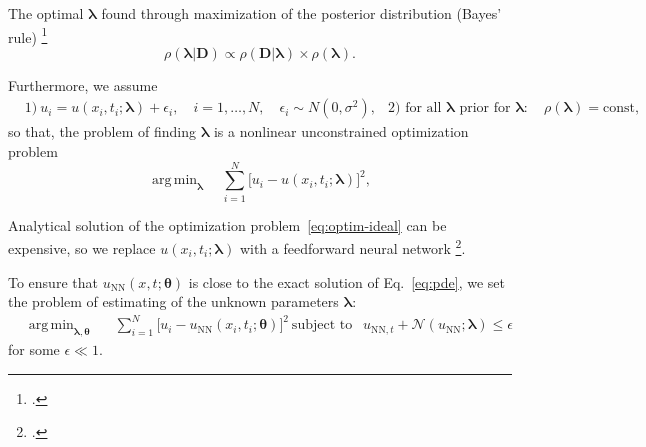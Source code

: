 \documentclass{beamer}
\def\\{}%
\newcommand{\Data}{\vec{D}}
\renewcommand{\vec}[1]{\boldsymbol{#1}}
\newcommand{\VTheta}{\ensuremath{\vec{\theta}}}
\newcommand{\VLambda}{\ensuremath{\vec{\lambda}}}
\DeclareMathOperator*{\argmin}{arg\,min}
\newcommand{\UNN}[1][\text{NN}]{u_{#1}}
\newcommand{\NonlinOp}{\mathcal N\!}
\begin{document}
\begin{frame}

The optimal $\VLambda$ found through
maximization of the posterior distribution (Bayes' rule) \footcite{sivia2006data}
\begin{equation*}
    \rho( \VLambda | \Data ) \propto
    \rho( \Data | \VLambda ) \times \rho( \VLambda ).
\end{equation*}

Furthermore, we assume
\begin{align*}
    & 1)~ u_i = u(x_i, t_i; \VLambda) + \epsilon_i, \quad i=1, \dots, N, \quad \epsilon_i \sim N(0, \sigma^2),\\
    & 2) \text{ for all } \vec{\lambda} \text{ prior for } \VLambda : \quad \rho(\vec{\lambda}) = \text{const},
\end{align*}
so that, the problem of finding $\VLambda$ is a nonlinear unconstrained
optimization problem
\begin{equation*}
    \label{eq:optim-ideal}
    \argmin_{\VLambda} \quad 
    \sum_{i=1}^{N} \big[ u_i - u(x_i, t_i; \VLambda) \big]^2, 
\end{equation*}
    
\end{frame}

\begin{frame}
Analytical solution of the optimization problem~\eqref{eq:optim-ideal} can be expensive, so 
we replace  $u(x_i, t_i; \VLambda)$ with a 
feedforward neural network \footcite{goodfellow2016deep, raissi2017pinnII}.

To ensure that $\UNN( x, t; \VTheta)$
is close to the exact solution of Eq.~\eqref{eq:pde}, we set the problem of estimating of the unknown parameters
$\VLambda$:
\begin{subequations}
\label{eq:optim-final}
\begin{align*}
    &\argmin_{\VLambda, \VTheta} \quad \ \ 
        \sum_{i=1}^N \big[u_i - \UNN(x_i, t_i; \VTheta)\big]^2  \\
    &\text{subject to } \ \ \UNN[\text{NN}, t]  + \NonlinOp(\UNN; \VLambda) \leq \epsilon
\end{align*}
\end{subequations}
for some $\epsilon \ll 1$.

\end{frame}
\end{document}
